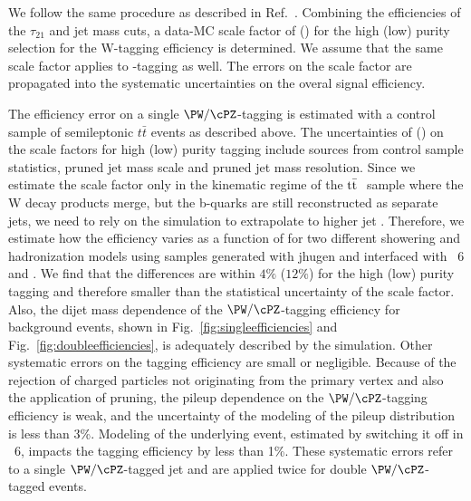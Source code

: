 We follow the same procedure as described in Ref.~\cite{JME-13-006}.
Combining the efficiencies of the $\tau_{21}$ and jet mass cuts, a data-MC scale factor of  \scalefactorHP
(\scalefactorLP) for the high (low) purity selection for the  W-tagging efficiency is determined.
We assume that the same scale factor applies to \zboson-tagging as well.
The errors on the scale factor are propagated
into the systematic uncertainties on the overal signal efficiency.





The efficiency error on a single $\PW/\cPZ$-tagging is estimated with
a control sample of semileptonic $t \bar t$ events as described above.
The uncertainties of \scalefactorHPu (\scalefactorLPu) on the scale
factors for high (low) purity tagging include sources from control
sample statistics, pruned jet mass scale and pruned jet mass
resolution.
Since we estimate the scale factor
only in the kinematic regime of the $\mathrm{t}\bar{\mathrm{t}}~$ sample where the W decay
products merge, but the b-quarks are still reconstructed as separate
jets, we need to rely on the simulation to extrapolate to
higher jet \pt.
Therefore, we estimate how the efficiency varies as a function of
\pt for two different showering and hadronization models using
\GBulk samples generated with {\sc jhugen} and interfaced with
\PYTHIA~6 and \HERWIG{++}.
We find that the differences are within $4\%$ ($12\%$)
for the high (low) purity tagging and therefore smaller than the
statistical uncertainty of the scale factor.
Also, the dijet mass dependence of the $\PW/\cPZ$-tagging efficiency for
background events, shown in Fig.~\ref{fig:singleefficiencies} and Fig.~\ref{fig:doubleefficiencies},
is adequately described by the simulation.
Other systematic errors on the tagging efficiency are small or
negligible.  Because of the rejection of charged particles not
originating from the primary vertex and also the application of
pruning, the pileup dependence on the $\PW/\cPZ$-tagging efficiency
is weak, and the uncertainty of the modeling of the pileup
distribution is less than 3\%.  Modeling of the underlying event,
estimated by switching it off in \PYTHIA~6, impacts the tagging
efficiency by less than 1\%.   These
systematic errors refer to a single $\PW/\cPZ$-tagged jet and are
applied twice for double $\PW/\cPZ$-tagged events.

